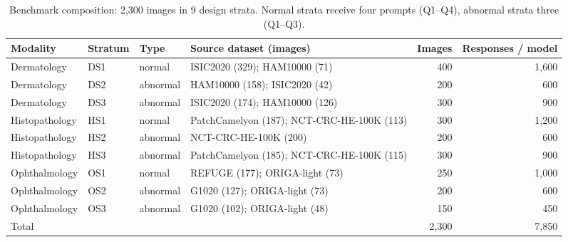 \begin{table}[t]
\centering
\small
\begin{tabular}{lllp{5.2cm}rr}
\toprule
Modality & Stratum & Type & Source dataset (images) & Images & Responses / model \\
\midrule
Dermatology & DS1 & normal & ISIC2020 (329); HAM10000 (71) & 400 & 1,600 \\
Dermatology & DS2 & abnormal & HAM10000 (158); ISIC2020 (42) & 200 & 600 \\
Dermatology & DS3 & abnormal & ISIC2020 (174); HAM10000 (126) & 300 & 900 \\
Histopathology & HS1 & normal & PatchCamelyon (187); NCT-CRC-HE-100K (113) & 300 & 1,200 \\
Histopathology & HS2 & abnormal & NCT-CRC-HE-100K (200) & 200 & 600 \\
Histopathology & HS3 & abnormal & PatchCamelyon (185); NCT-CRC-HE-100K (115) & 300 & 900 \\
Ophthalmology & OS1 & normal & REFUGE (177); ORIGA-light (73) & 250 & 1,000 \\
Ophthalmology & OS2 & abnormal & G1020 (127); ORIGA-light (73) & 200 & 600 \\
Ophthalmology & OS3 & abnormal & G1020 (102); ORIGA-light (48) & 150 & 450 \\
\midrule
Total &  &  &  & 2,300 & 7,850 \\
\bottomrule
\end{tabular}
\caption{Benchmark composition: 2,300 images in 9 design strata. Normal strata receive four prompts (Q1--Q4), abnormal strata three (Q1--Q3).}
\label{tab:dataset}
\end{table}
